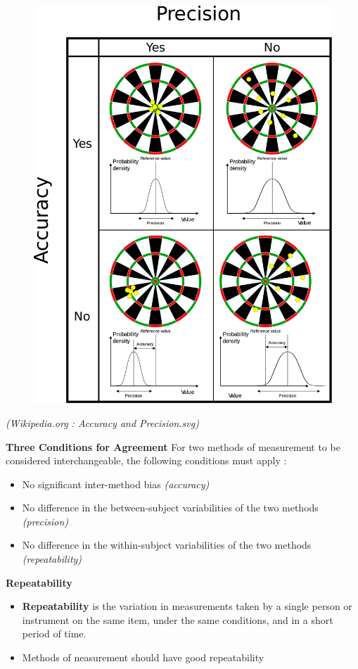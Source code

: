 \documentclass[compress]{beamer}        %
\makeatletter
\newcommand{\tcb}{\textcolor{beamer@blendedblue}}
\makeatother
\begin{document}
		\begin{frame}
			\begin{figure}
\centering
\includegraphics[width=0.45\linewidth]{images/AccuracyPrecision}
\end{figure}
\textit{(Wikipedia.org : Accuracy and Precision.svg)}
		\end{frame}
		\begin{frame}{\bf \tcb{Three Conditions for Agreement}}
			\Large
			For two methods of measurement to be considered interchangeable, the following conditions must apply \cite{Roy2009}:
			\\
			\begin{itemize}\itemsep0.5cm
				\item No significant inter-method bias \textit{(accuracy)}
				\item No difference in the between-subject variabilities of the two methods \textit{(precision)}
				\item No difference in the within-subject variabilities of the two methods \textit{(repeatability)}
			\end{itemize}
		\end{frame}
		
\begin{frame}
\Large
\noindent \textbf{Repeatability}
\begin{itemize}
\item \textbf{Repeatability}  is the variation in measurements taken by a single person or instrument on the same item, under the same conditions, and in a short period of time.
\item Methods of neasurement should have good repeatability
\end{itemize}
\end{frame}
		
\end{document}
